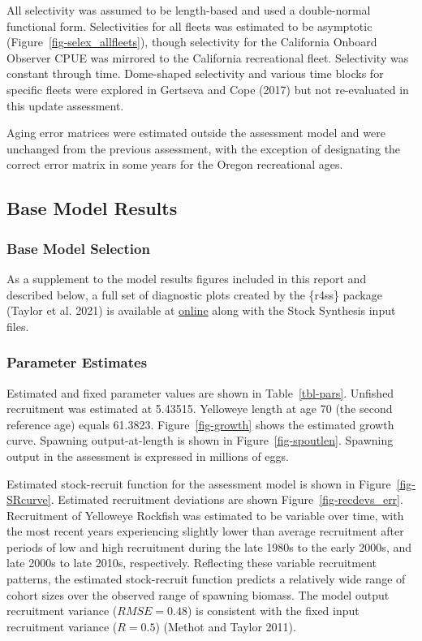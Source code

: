 \documentclass[
]{scrartcl}
\begin{document}
All selectivity was assumed to be length-based and used a double-normal
functional form. Selectivities for all fleets was estimated to be
asymptotic (Figure~\ref{fig-selex_allfleets}), though selectivity for
the California Onboard Observer CPUE was mirrored to the California
recreational fleet. Selectivity was constant through time. Dome-shaped
selectivity and various time blocks for specific fleets were explored in
Gertseva and Cope (2017) but not re-evaluated in this update assessment.

Aging error matrices were estimated outside the assessment model and
were unchanged from the previous assessment, with the exception of
designating the correct error matrix in some years for the Oregon
recreational ages.

\subsection{Base Model Results}\label{base-model-results}

\subsubsection{Base Model Selection}\label{base-model-selection}

As a supplement to the model results figures included in this report and
described below, a full set of diagnostic plots created by the \{r4ss\}
package (Taylor et al. 2021) is available at
\href{https://github.com/rclairer/Sebastes_ruberrimus_2025}{online}
along with the Stock Synthesis input files.

\subsubsection{Parameter Estimates}\label{parameter-estimates}

Estimated and fixed parameter values are shown in Table~\ref{tbl-pars}.
Unfished recruitment was estimated at 5.43515. Yelloweye length at age
70 (the second reference age) equals 61.3823. Figure~\ref{fig-growth}
shows the estimated growth curve. Spawning output-at-length is shown in
Figure~\ref{fig-spoutlen}. Spawning output in the assessment is
expressed in millions of eggs.

Estimated stock-recruit function for the assessment model is shown in
Figure~\ref{fig-SRcurve}. Estimated recruitment deviations are shown
Figure~\ref{fig-recdevs_err}. Recruitment of Yelloweye Rockfish was
estimated to be variable over time, with the most recent years
experiencing slightly lower than average recruitment after periods of
low and high recruitment during the late 1980s to the early 2000s, and
late 2000s to late 2010s, respectively. Reflecting these variable
recruitment patterns, the estimated stock-recruit function predicts a
relatively wide range of cohort sizes over the observed range of
spawning biomass. The model output recruitment variance
(\(RMSE = 0.48\)) is consistent with the fixed input recruitment
variance (\(R = 0.5\)) (Methot and Taylor 2011).
\end{document}
